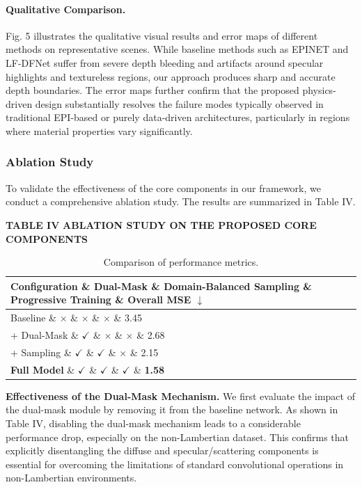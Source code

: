 \documentclass[lettersize,journal]{IEEEtran}
\begin{document}
{\paragraph{Qualitative Comparison.}
Fig. 5 illustrates the qualitative visual results and error maps of different methods on representative scenes. While baseline methods such as EPINET and LF-DFNet suffer from severe depth bleeding and artifacts around specular highlights and textureless regions, our approach produces sharp and accurate depth boundaries. The error maps further confirm that the proposed physics-driven design substantially resolves the failure modes typically observed in traditional EPI-based or purely data-driven architectures, particularly in regions where material properties vary significantly.

\subsubsection{Ablation Study}

To validate the effectiveness of the core components in our framework, we conduct a comprehensive ablation study. The results are summarized in Table IV.

\textbf{TABLE IV}
\textbf{ABLATION STUDY ON THE PROPOSED CORE COMPONENTS}

\begin{table}[!t]
\caption{Comparison of performance metrics.}
\label{tab:comparison}
\centering
\begin{tabular*}{\linewidth}{@{\extracolsep{\fill}}lllll}
\toprule
Configuration \& Dual-Mask \& Domain-Balanced Sampling \& Progressive Training \& Overall MSE $\downarrow$ \\
\midrule
Baseline \& $\times$ \& $\times$ \& $\times$ \& 3.45 \\
+ Dual-Mask \& $\checkmark$ \& $\times$ \& $\times$ \& 2.68 \\
+ Sampling \& $\checkmark$ \& $\checkmark$ \& $\times$ \& 2.15 \\
\textbf{Full Model} \& $\checkmark$ \& $\checkmark$ \& $\checkmark$ \& \textbf{1.58} \\
\bottomrule
\end{tabular*}
\end{table}
\textbf{Effectiveness of the Dual-Mask Mechanism.}
We first evaluate the impact of the dual-mask module by removing it from the baseline network. As shown in Table IV, disabling the dual-mask mechanism leads to a considerable performance drop, especially on the non-Lambertian dataset. This confirms that explicitly disentangling the diffuse and specular/scattering components is essential for overcoming the limitations of standard convolutional operations in non-Lambertian environments.

}
\end{document}
